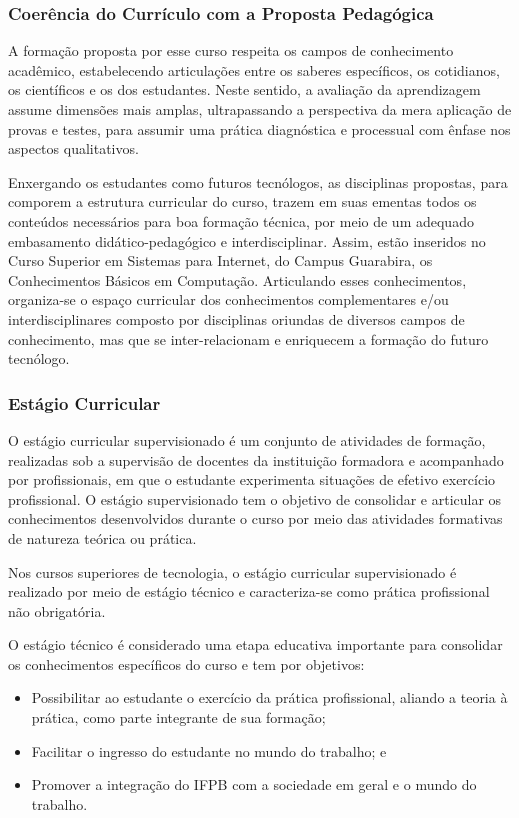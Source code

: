 \subsubsection{Coerência do Currículo com a Proposta Pedagógica}

A formação proposta por esse curso respeita os campos de conhecimento acadêmico, estabelecendo articulações entre os saberes específicos, os cotidianos, os científicos e os dos estudantes.  Neste sentido, a avaliação da aprendizagem assume dimensões mais amplas, ultrapassando a perspectiva da mera aplicação de provas e testes, para assumir uma prática diagnóstica e processual com ênfase nos aspectos qualitativos.

Enxergando os estudantes como futuros tecnólogos, as disciplinas propostas, para comporem a estrutura curricular do curso, trazem em suas ementas todos os conteúdos necessários para boa formação técnica, por meio de um adequado embasamento didático-pedagógico e interdisciplinar. Assim, estão inseridos no Curso Superior em Sistemas para Internet, do Campus Guarabira, os Conhecimentos Básicos em Computação. Articulando esses conhecimentos, organiza-se o espaço curricular dos conhecimentos complementares e/ou interdisciplinares composto por disciplinas oriundas de diversos campos de conhecimento, mas que se inter-relacionam e enriquecem a formação do futuro tecnólogo.

\subsubsection{Estágio Curricular}

O estágio curricular supervisionado é um conjunto de atividades de formação, realizadas sob a supervisão de docentes da instituição formadora e acompanhado por profissionais, em que o estudante experimenta situações de efetivo exercício profissional. O estágio supervisionado tem o objetivo de consolidar e articular os conhecimentos desenvolvidos durante o curso por meio das atividades formativas de natureza teórica ou prática.

Nos cursos superiores de tecnologia, o estágio curricular supervisionado é realizado por meio de estágio técnico e caracteriza-se como prática profissional não obrigatória.

O estágio técnico é considerado uma etapa educativa importante para consolidar os conhecimentos específicos do curso e tem por objetivos:

\begin{itemize}
	\item Possibilitar ao estudante o exercício da prática profissional, aliando a teoria à prática, como parte integrante de sua formação;
	\item Facilitar o ingresso do estudante no mundo do trabalho; e
	\item Promover a integração do IFPB com a sociedade em geral e o mundo do trabalho.
\end{itemize}
	
